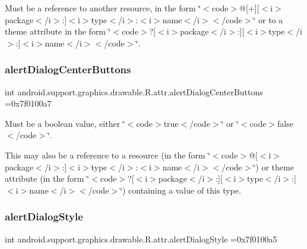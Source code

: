 Must be a reference to another resource, in the form \char`\"{}$<$code$>$@\mbox{[}+\mbox{]}\mbox{[}$<$i$>$package$<$/i$>$\+:\mbox{]}$<$i$>$type$<$/i$>$\+:$<$i$>$name$<$/i$>$$<$/code$>$\char`\"{} or to a theme attribute in the form \char`\"{}$<$code$>$?\mbox{[}$<$i$>$package$<$/i$>$\+:\mbox{]}\mbox{[}$<$i$>$type$<$/i$>$\+:\mbox{]}$<$i$>$name$<$/i$>$$<$/code$>$\char`\"{}. \mbox{\label{classandroid_1_1support_1_1graphics_1_1drawable_1_1R_1_1attr_aa275fbc175f5816461cbf7219e218779}} 
\subsubsection{\texorpdfstring{alert\+Dialog\+Center\+Buttons}{alertDialogCenterButtons}}
{\footnotesize\ttfamily int android.\+support.\+graphics.\+drawable.\+R.\+attr.\+alert\+Dialog\+Center\+Buttons =0x7f0100a7\hspace{0.3cm}{\ttfamily [static]}}

Must be a boolean value, either \char`\"{}$<$code$>$true$<$/code$>$\char`\"{} or \char`\"{}$<$code$>$false$<$/code$>$\char`\"{}. 

This may also be a reference to a resource (in the form \char`\"{}$<$code$>$@\mbox{[}$<$i$>$package$<$/i$>$\+:\mbox{]}$<$i$>$type$<$/i$>$\+:$<$i$>$name$<$/i$>$$<$/code$>$\char`\"{}) or theme attribute (in the form \char`\"{}$<$code$>$?\mbox{[}$<$i$>$package$<$/i$>$\+:\mbox{]}\mbox{[}$<$i$>$type$<$/i$>$\+:\mbox{]}$<$i$>$name$<$/i$>$$<$/code$>$\char`\"{}) containing a value of this type. \mbox{\label{classandroid_1_1support_1_1graphics_1_1drawable_1_1R_1_1attr_af4f246d9f5f076a5cfd53e001bbf3b02}} 
\subsubsection{\texorpdfstring{alert\+Dialog\+Style}{alertDialogStyle}}
{\footnotesize\ttfamily int android.\+support.\+graphics.\+drawable.\+R.\+attr.\+alert\+Dialog\+Style =0x7f0100a5\hspace{0.3cm}{\ttfamily [static]}}

